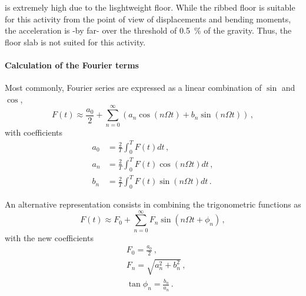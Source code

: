 \begin{Answer}[ref={footfall_analysis}]
is extremely high due to the lisghtweight floor. While the ribbed floor is suitable for this activity from the point of view of displacements and bending moments, the acceleration is -by far- over the threshold of \SI{0.5}{\%} of the gravity. Thus, the floor slab is not suited for this activity.


\paragraph{Calculation of the Fourier terms}
Most commonly, Fourier series are expressed as a linear combination of $\sin$ and $\cos$,
$$
F(t) \approx \frac{a_0}{2} + \sum_{n=0}^{\infty} \left(a_n\cos(n\Omega t) + b_n\sin(n\Omega t)\right)\, ,
$$
with coefficients
\begin{align*}
a_0 &= \frac{2}{T}\int_{0}^{T} F(t) dt \, , \\
a_n &= \frac{2}{T}\int_{0}^{T} F(t) \cos(n\Omega t) dt \, , \\
b_n &= \frac{2}{T}\int_{0}^{T} F(t) \sin(n\Omega t) dt \, .
\end{align*}

An alternative representation consists in combining the trigonometric functions as
$$
F(t) \approx F_0 + \sum_{n=0}^{\infty} F_n\sin(n\Omega t + \phi_n) \, ,
$$
with the new coefficients
\begin{align*}
&F_0 = \frac{a_0}{2} \, , \\
&F_n = \sqrt{a_n^2 + b_n^2} \, , \\
&\tan\phi_n = \frac{b_n}{a_n} \, . \\
\end{align*}


\begin{center}
\end{center}

\end{Answer}
